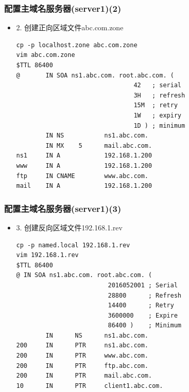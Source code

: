 \documentclass[xcolor=svgnames,presentation]{beamer}
\begin{document}
\begin{frame}[fragile]
\frametitle{配置主域名服务器(server1)(2)}
\label{sec-1-8}
\begin{itemize}

\item 2. 创建正向区域文件abc.com.zone\\
\label{sec-1-8-1}%
\begin{verbatim}
cp -p localhost.zone abc.com.zone
vim abc.com.zone
$TTL 86400
@       IN SOA ns1.abc.com. root.abc.com. (
                                42   ; serial
                                3H   ; refresh
                                15M  ; retry
                                1W   ; expiry
                                1D ) ; minimum
        IN NS           ns1.abc.com.
        IN MX    5      mail.abc.com.
ns1     IN A            192.168.1.200
www     IN A            192.168.1.200
ftp     IN CNAME        www.abc.com.
mail    IN A            192.168.1.200
\end{verbatim}
\end{itemize} %
\end{frame}
\begin{frame}[fragile]
\frametitle{配置主域名服务器(server1)(3)}
\label{sec-1-9}
\begin{itemize}

\item 3. 创建反向区域文件192.168.1.rev\\
\label{sec-1-9-1}%
\begin{verbatim}
cp -p named.local 192.168.1.rev
vim 192.168.1.rev
$TTL 86400
@ IN SOA ns1.abc.com. root.abc.com. (
                         2016052001 ; Serial
                         28800      ; Refresh
                         14400      ; Retry
                         3600000    ; Expire
                         86400 )    ; Minimum
        IN      NS      ns1.abc.com.
200     IN      PTR     ns1.abc.com.
200     IN      PTR     www.abc.com.
200     IN      PTR     ftp.abc.com.
200     IN      PTR     mail.abc.com.
10      IN      PTR     client1.abc.com.
\end{verbatim}
\end{itemize} %
\end{frame}
\end{document}
